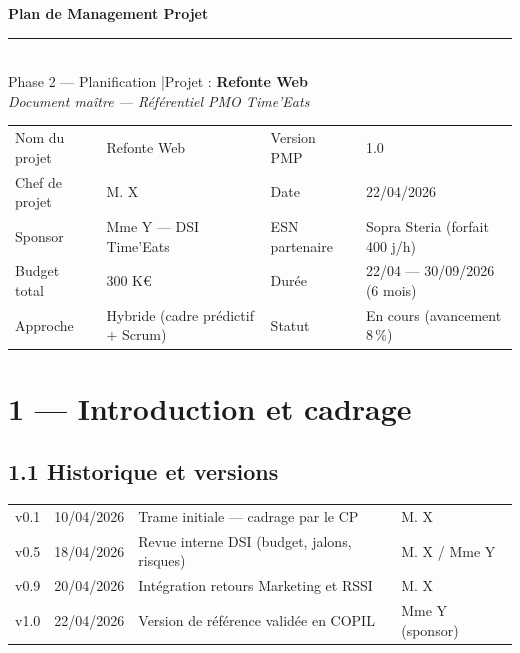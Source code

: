 \documentclass[11pt,a4paper,oneside]{report}
\begin{document}
\small

\begin{center}
{\LARGE\bfseries\color{cnNavy} Plan de Management Projet}\\[4pt]
\textcolor{cnOrange}{\rule{10cm}{1pt}}\\[4pt]
{\large\color{cnSlate} Phase 2 --- Planification \quad|\quad Projet : \textbf{Refonte Web}}\\[2pt]
{\footnotesize\color{cnSlate}\textit{Document maître --- Référentiel PMO Time'Eats}}
\end{center}

\vspace{4pt}
\renewcommand{\arraystretch}{1.4}
\begin{tabularx}{\textwidth}{L{3.5cm} Y L{3.5cm} Y}
\toprule
{} &  &  &  \\
\midrule
Nom du projet   & Refonte Web                  & Version PMP    & 1.0 \\
Chef de projet  & M. X                    & Date           & 22/04/2026 \\
Sponsor         & Mme Y --- DSI Time'Eats  & ESN partenaire & Sopra Steria (forfait 400 j/h) \\
Budget total    & 300 K€                       & Durée          & 22/04 --- 30/09/2026 (6 mois) \\
Approche        & Hybride (cadre prédictif + Scrum) & Statut    & En cours (avancement 8\,\%) \\
\bottomrule
\end{tabularx}

\section*{1 --- Introduction et cadrage}

\subsection*{1.1 Historique et versions}
\renewcommand{\arraystretch}{1.3}
\begin{tabularx}{\textwidth}{L{2cm} L{3cm} Y L{2.5cm}}
\toprule
{} &  &  &  \\
\midrule
v0.1 & 10/04/2026 & Trame initiale --- cadrage par le CP & M. X \\
v0.5 & 18/04/2026 & Revue interne DSI (budget, jalons, risques) & M. X / Mme Y \\
v0.9 & 20/04/2026 & Intégration retours Marketing et RSSI & M. X \\
v1.0 & 22/04/2026 & Version de référence validée en COPIL & Mme Y (sponsor) \\
\bottomrule
\end{tabularx}
\end{document}

